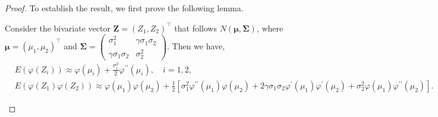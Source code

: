 \begin{proof}
To establish the result, we first prove the following lemma. 
\begin{lemma}
\label{lem:approxlogitnormal}
Consider the bivariate vector $\mathbf{Z}=(Z_1,Z_2)^{\top}$ that follows $N(\boldsymbol{\mu},\boldsymbol{\Sigma})$, where $\boldsymbol{\mu}=(\mu_1,\mu_2)^{\top}$ and 
$\boldsymbol{\Sigma}=\begin{pmatrix} \sigma_1^2 & \gamma\sigma_1\sigma_2 \\ \gamma\sigma_1\sigma_2 & \sigma_2^2 \end{pmatrix}$.
Then we have,
\begin{equation*}
    \begin{split}
        & E(\varphi(Z_i))\approx \varphi(\mu_i)+\frac{\sigma_i^2}{2}\varphi^{\prime\prime}(\mu_i),\quad i=1,2,\\
        & E(\varphi(Z_1)\varphi(Z_2))\approx \varphi(\mu_1)\varphi(\mu_2)+\frac{1}{2}[\sigma_1^2\varphi^{\prime\prime}(\mu_1)\varphi(\mu_2)+2\gamma\sigma_1\sigma_2\varphi^{\prime}(\mu_1)\varphi^{\prime}(\mu_2)+\sigma_2^2\varphi(\mu_1)\varphi^{\prime\prime}(\mu_2)].
    \end{split}
   \label{eq:momentlogitnormal}
\end{equation*}
\end{lemma}


\end{proof}
